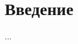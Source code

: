 \documentclass[../document.tex]{subfiles}
\begin{document}
	\section*{Введение}
	    \par ...
\end{document}
